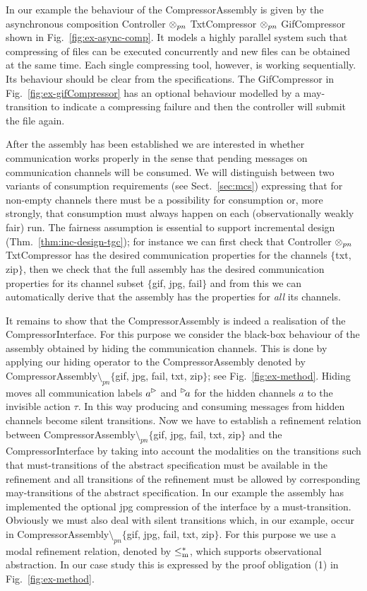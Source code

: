 In our example the behaviour of the \textsf{CompressorAssembly} is given by the asynchronous composition
\textsf{Controller} $\otimes_{pn}$ \textsf{TxtCompressor}  $\otimes_{pn}$ \textsf{GifCompressor}
shown in Fig.~\ref{fig:ex-async-comp}. It models a highly parallel system such that compressing of files can be executed concurrently and
new files can be obtained at the same time. 
Each single compressing tool, however, is working sequentially.
Its behaviour should be clear from the specifications.
The \textsf{GifCompressor} in Fig.~\ref{fig:ex-gifCompressor} has an optional behaviour modelled by a may-transition 
to indicate a compressing failure and then the controller will submit the file again.

After the assembly has been established we are interested in whether communication works properly in the sense
that pending messages on communication channels will be consumed. We will distinguish between two variants of
consumption requirements (see Sect.~\ref{sec:mcs}) expressing that for non-empty channels there must be a possibility for consumption or,
more strongly, that consumption must always happen on each (observationally weakly fair) run.
The fairness assumption is essential to support incremental design (Thm.~\ref{thm:inc-design-tgc}); for instance we can first check
that \textsf{Controller} $\otimes_{pn}$ \textsf{TxtCompressor} has the desired communication properties for the
channels $\{$\textsf{txt, zip}$\}$, then we check that the full assembly
 has the desired communication properties for its
channel subset $\{$\textsf{gif, jpg, fail}$\}$ and from this we can automatically derive that the assembly has the
properties for \emph{all} its channels. 

It remains to show that the \textsf{CompressorAssembly} is indeed a realisation of the \textsf{CompressorInterface}.
For this purpose we consider the black-box behaviour of the assembly obtained by hiding the
communication channels. This is done by applying our hiding operator to the \textsf{CompressorAssembly}
denoted by \textsf{CompressorAssembly}$\setminus_{pn}\{$\textsf{gif, jpg, fail, txt, zip}$\}$; see Fig.~\ref{fig:ex-method}.
Hiding moves all communication labels
$\outact{a}$ and $\inact{a}$  for the hidden channels $a$ to the invisible action $\tau$.
In this way producing and consuming messages from hidden channels become silent transitions.
Now we have to establish a refinement relation between \textsf{CompressorAssembly}$\setminus_{pn}\{$\textsf{gif, jpg, fail, txt, zip}$\}$
and the \textsf{CompressorInterface} by taking into account the modalities on the transitions such that
must-transitions of the abstract specification must be available in the refinement and all transitions of the refinement
must be allowed by corresponding may-transitions of the abstract specification.
In our example the assembly has implemented the optional jpg compression of the interface by a must-transition.
Obviously we must also deal with silent transitions which, in our example,
occur in \textsf{CompressorAssembly}$\setminus_{pn}\{$\textsf{gif, jpg, fail, txt, zip}$\}$. For this purpose we use
a modal refinement relation, denoted by $\le^*_\mathrm m$, which supports observational abstraction. 
In our case study this is expressed by the proof obligation (1) in Fig.~\ref{fig:ex-method}.

